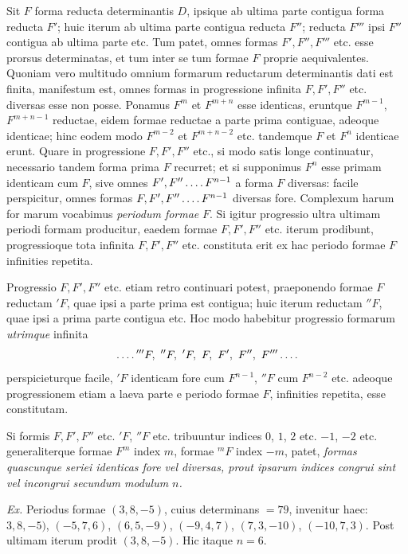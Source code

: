 Sit $F$ forma reducta determinantis $D$, ipsique ab ultima parte contigua forma reducta $F'$; huic iterum ab ultima parte contigua reducta $F''$; reducta $F'''$ ipsi $F''$ contigua ab ultima parte etc. Tum patet, omnes formas $F',F'',F'''$ etc. esse prorsus determinatas, et tum inter se tum formae $F$ proprie aequivalentes. Quoniam vero multitudo omnium formarum reductarum determinantis dati est finita, manifestum est, omnes formas in progressione infinita $F,F',F''$ etc. diversas esse non posse. Ponamus $F^m$ et $F^{m+n}$ esse identicas, eruntque $F^{m-1}$, $F^{m+n-1}$ reductae, eidem formae reductae a parte prima contiguae, adeoque identicae; hinc eodem modo $F^{m-2}$ et $F^{m+n-2}$ etc. tandemque $F$ et $F^n$ identicae erunt. Quare in progressione $F,F',F''$ etc., si modo satis longe continuatur, necessario tandem forma prima $F$ recurret; et si supponimus $F^n$ esse primam identicam cum $F$, sive omnes $F',F''\mathinner{\ldotp\ldotp\ldotp\ldotp} F^{n-1}$ a forma $F$ diversas: facile perspicitur, omnes formas $F,F',F''\mathinner{\ldotp\ldotp\ldotp\ldotp} F^{n-1}$ diversas fore. Complexum harum for%
%
marum vocabimus \textit{periodum formae} $F$. Si igitur progressio ultra ultimam periodi formam producitur, eaedem formae $F,F',F''$ etc. iterum prodibunt, progressioque tota infinita $F,F',F''$ etc. constituta erit ex hac periodo formae $F$ infinities repetita.

Progressio $F,F',F''$ etc. etiam retro continuari potest, praeponendo formae $F$ reductam ${}'F$, quae ipsi a parte prima est contigua; huic iterum reductam ${}''F$, quae ipsi a prima parte contigua etc. Hoc modo habebitur progressio formarum \textit{utrimque} infinita
\[
\mathinner{\ldotp\ldotp\ldotp\ldotp} {}'''F,\ {}''F,\ {}'F,\ F,\ F',\ F'',\ F'''\mathinner{\ldotp\ldotp\ldotp\ldotp}
\]
perspicieturque facile, ${}'F$ identicam fore cum $F^{n-1}$, ${}''F$ cum $F^{n-2}$ etc. adeoque progressionem etiam a laeva parte e periodo formae $F$, infinities repetita, esse constitutam.

Si formis $F,F',F''$ etc. ${}'F$, ${}''F$ etc. tribuuntur indices $0$, $1$, $2$ etc. $-1$, $-2$ etc. generaliterque formae $F^m$ index $m$, formae ${}^mF$ index $-m$, patet, \textit{formas quascunque seriei identicas fore vel diversas, prout ipsarum indices congrui sint vel incongrui secundum modulum $n$.}

\textit{Ex.} Periodus formae $(3,8,-5)$, cuius determinans $=79$, invenitur haec: ${3,8,-5)}$, $(-5,7,6)$, $(6,5,-9)$, $(-9,4,7)$, $(7,3,-10)$, $(-10,7,3)$. Post ultimam iterum prodit $(3,8,-5)$. Hic itaque $n=6$.

